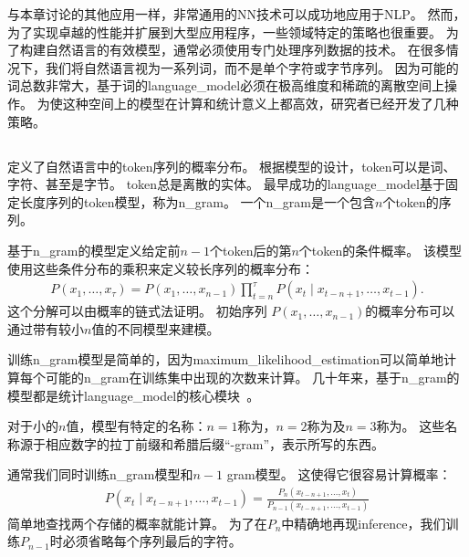 
与本章讨论的其他应用一样，非常通用的\gls{NN}技术可以成功地应用于\gls{NLP}。
然而，为了实现卓越的性能并扩展到大型应用程序，一些领域特定的策略也很重要。
为了构建自然语言的有效模型，通常必须使用专门处理序列数据的技术。
在很多情况下，我们将自然语言视为一系列词，而不是单个字符或字节序列。
因为可能的词总数非常大，基于词的\gls{language_model}必须在极高维度和稀疏的离散空间上操作。
为使这种空间上的模型在计算和统计意义上都高效，研究者已经开发了几种策略。

\subsection{}
\label{sec:n_grams}

定义了自然语言中的\gls{token}序列的概率分布。
根据模型的设计，\gls{token}可以是词、字符、甚至是字节。
\gls{token}总是离散的实体。
最早成功的\gls{language_model}基于固定长度序列的\gls{token}模型，称为\gls{n_gram}。
一个\gls{n_gram}是一个包含$n$个\gls{token}的序列。


基于\gls{n_gram}的模型定义给定前$n-1$个\gls{token}后的第$n$个\gls{token}的条件概率。
该模型使用这些条件分布的乘积来定义较长序列的概率分布：
\begin{align}
P(x_1, \dots, x_\tau) = P(x_1, \dots, x_{n-1}) \prod_{t=n}^\tau P(x_t \mid x_{t-n+1}, \dots, x_{t-1} ).
\end{align}
这个分解可以由概率的链式法证明。
初始序列 $P(x_1, \dots, x_{n-1})$的概率分布可以通过带有较小$n$值的不同模型来建模。

训练\gls{n_gram}模型是简单的，因为\gls{maximum_likelihood_estimation}可以简单地计算每个可能的\gls{n_gram}在训练集中出现的次数来计算。                                                                                                                                                                                                                                                                                                                                                                                       
几十年来，基于\gls{n_gram}的模型都是统计\gls{language_model}的核心模块~\citep{Jelinek+Mercer80,Katz87,Chen+Goodman99}。

对于小的$n$值，模型有特定的名称：$n=1$称为，$n=2$称为及$n=3$称为。
这些名称源于相应数字的拉丁前缀和希腊后缀``-gram''，表示所写的东西。


通常我们同时训练\gls{n_gram}模型和$n-1$ gram模型。 
这使得它很容易计算概率：
\begin{align}
\label{eq:ml-ngram}
P(x_t \mid x_{t-n+1}, \dots, x_{t-1}) = \frac{P_n(x_{t-n+1}, \dots, x_t)} { P_{n-1}( x_{t-n+1}, \dots, x_{t-1}) }
\end{align}
简单地查找两个存储的概率就能计算。
为了在$P_n$中精确地再现\gls{inference}，我们训练$P_{n-1}$时必须省略每个序列最后的字符。

